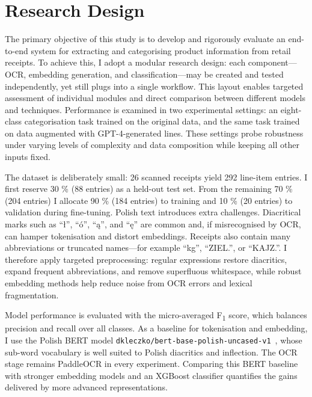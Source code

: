 \documentclass{SGGW-thesis-EN}
\begin{document}
\section{Research Design}
The primary objective of this study is to develop and rigorously evaluate an end-to-end system for extracting and
categorising product information from retail receipts.  To achieve this, I adopt a modular research design: each
component—OCR, embedding generation, and classification—may be created and tested independently, yet still plugs into a
single workflow.  This layout enables targeted assessment of individual modules and direct comparison between different
models and techniques.  Performance is examined in two experimental settings: an eight-class categorisation task trained
on the original data, and the same task trained on data augmented with GPT-4-generated lines.
These settings probe robustness under varying levels of complexity and data composition while keeping all other inputs
fixed.

The dataset is deliberately small: 26 scanned receipts yield 292 line-item entries.  I first reserve 30 \% (88 entries)
as a held-out test set.  From the remaining 70 \% (204 entries) I allocate 90 \% (184 entries) to training and 10 \%
(20 entries) to validation during fine-tuning.
Polish text introduces extra challenges.  Diacritical marks such as “ł”, “ó”, “ą”, and “ę” are common and, if
misrecognised by OCR, can hamper tokenisation and distort embeddings.  Receipts also contain many abbreviations or
truncated names—for example “kg”, “ZIEL.”, or “KAJZ.”.  I therefore apply targeted preprocessing: regular expressions
restore diacritics, expand frequent abbreviations, and remove superfluous whitespace, while robust embedding methods
help reduce noise from OCR errors and lexical fragmentation.

Model performance is evaluated with the micro-averaged F\textsubscript{1} score, which balances precision and recall
over all classes.  As a baseline for tokenisation and embedding, I use the Polish BERT model
\texttt{dkleczko/bert-base-polish-uncased-v1}~\cite{kleczek2020polbert},
whose sub-word vocabulary is well suited to Polish diacritics and inflection.  The OCR stage remains PaddleOCR in every
experiment. Comparing this BERT baseline with stronger embedding models and an XGBoost classifier quantifies the gains delivered by more advanced
representations.
\end{document}
